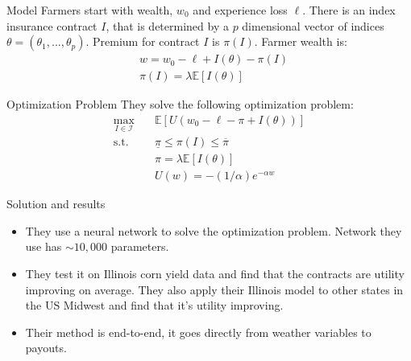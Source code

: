 \documentclass{beamer}
\begin{document}
  
\begin{frame}{Model}
    Farmers start with wealth, $w_0$ and experience loss $\ell$. There is an index insurance contract $I$, that is determined by a $p$ dimensional vector of indices $\theta = (\theta_1,...,\theta_p)$. Premium for contract $I$ is $\pi(I)$. Farmer wealth is: 
    \begin{align*}
       & w = w_0 -\ell + I(\theta) -\pi(I)\\
       & \pi(I) = \lambda \mathbb{E}[I(\theta)]
    \end{align*}
\end{frame}

\begin{frame}{Optimization Problem}
    They solve the following optimization problem: 
    \begin{align}
        \max_{I \in \mathcal{I}}  & \quad \mathbb{E} \left [ U \left ( w_0 - \ell - \pi + I(\theta) \right ) \right ]\nonumber \\
        \text{s.t.} & \quad \underline{\pi} \leq \pi(I) \leq \overline{\pi}\\
        & \quad \pi = \lambda \mathbb{E}\left [ I(\theta) \right ] \\
        & \quad U \left (w \right ) = -(1/\alpha)e^{-\alpha w} 
    \end{align}
\end{frame}

\begin{frame}{Solution and results}
    \begin{itemize}
       \setlength\itemsep{2em}
        \item They use a neural network to solve the optimization problem. Network they use has $\sim 10,000$ parameters. 
        \item They test it on Illinois corn yield data and find that the contracts are utility improving on average. They also apply their Illinois model to other states in the US Midwest and find that it's utility improving. 
        \item Their method is end-to-end, it goes directly from weather variables to payouts. 
    \end{itemize}    
    \end{frame}
\end{document}
